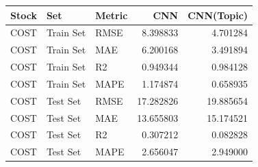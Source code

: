 \begin{tabular}{lllrr}
\toprule
Stock & Set & Metric & CNN & CNN(Topic) \\
\midrule
COST & Train Set & RMSE & 8.398833 & 4.701284 \\
COST & Train Set & MAE & 6.200168 & 3.491894 \\
COST & Train Set & R2 & 0.949344 & 0.984128 \\
COST & Train Set & MAPE & 1.174874 & 0.658935 \\
COST & Test Set & RMSE & 17.282826 & 19.885654 \\
COST & Test Set & MAE & 13.655803 & 15.174521 \\
COST & Test Set & R2 & 0.307212 & 0.082828 \\
COST & Test Set & MAPE & 2.656047 & 2.949000 \\
\bottomrule
\end{tabular}
